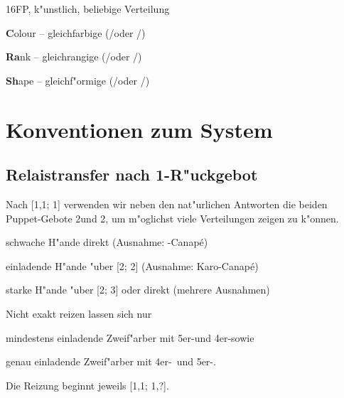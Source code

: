 \bdsc
\item[(1\tre)] 16\pl FP, k"unstlich, beliebige Verteilung
\bdsc
\item[\kontra] \textbf{C}olour -- gleichfarbige (\tr/\pi oder \ka/\co)
\item[1\kar] \textbf{Ra}nk -- gleichrangige (\tr/\ka oder \co/\pi)
\item[1\of] \nat
\item[1\SA] \textbf{Sh}ape -- gleichf"ormige (\tr/\co oder \ka/\pi)
\item[2\uf] \nat
\edsc
\edsc

\newpage
\section{Konventionen zum System}

%
%
\subsection{Relaistransfer nach 1\SA-R"uckgebot} \label{1sarebid}

Nach [1\anybid{}\sep1\of; 1\SA{}] verwenden wir neben den nat"urlichen Antworten
die beiden Puppet-Gebote 2\tre und 2\SA, um m"oglichst viele Verteilungen zeigen
zu k"onnen.

\begin{compactitem}
\item schwache H"ande direkt (Ausnahme: \ufa-Canap\'e)
\item einladende H"ande "uber [2\tre; 2\kar{}] (Ausnahme:
  Karo-Canap\'e)
\item starke H"ande "uber [2\SA; 3\tre{}] oder direkt (mehrere Ausnahmen)
\end{compactitem}

Nicht exakt reizen lassen sich nur
\begin{compactitem}
\item mindestens einladende Zweif"arber mit 5er-\ofa und 4er-\ufa sowie
\item genau einladende Zweif"arber mit 4er-\ofa\ und 5er-\tr.
\end{compactitem}

Die Reizung beginnt jeweils [1\anybid{}\sep1\of; 1\SA{}\sep?].

